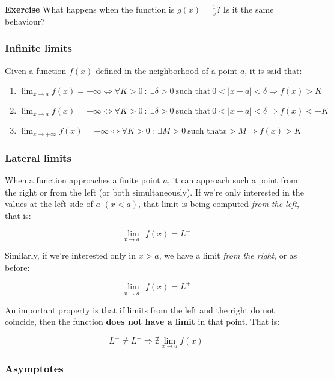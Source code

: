 \documentclass[11pt]{article}
\providecommand{\tightlist}{%
      \setlength{\itemsep}{0pt}\setlength{\parskip}{0pt}}
\begin{document}
    \textbf{Exercise} What happens when the function is
\(g(x) = \frac{1}{x}\)? Is it the same behaviour?

\hypertarget{infinite-limits}{%
\subsubsection{Infinite limits}\label{infinite-limits}}

Given a function \(f(x)\) defined in the neighborhood of a point \(a\),
it is said that:

\begin{enumerate}
\def\labelenumi{\arabic{enumi}.}
\tightlist
\item
  \(\lim_{x\rightarrow a} f(x) = +\infty \iff \forall K > 0 \ : \ \exists\delta > 0 \ \text{such that} \ 0<\lvert x-a\rvert<\delta\Rightarrow f(x) > K\)
\item
  \(\lim_{x\rightarrow a} f(x) = -\infty \iff \forall K > 0 \ : \ \exists\delta > 0 \ \text{such that} \ 0<\lvert x-a\rvert<\delta\Rightarrow f(x) < -K\)
\item
  \(\lim_{x\rightarrow +\infty} f(x) = +\infty \iff \forall K>0 \ : \ \exists M >0 \ \text{such that} x > M \Rightarrow f(x) > K\)
\end{enumerate}

\hypertarget{lateral-limits}{%
\subsubsection{Lateral limits}\label{lateral-limits}}

When a function approaches a finite point \(a\), it can approach such a
point from the right or from the left (or both simultaneously). If we're
only interested in the values at the left side of \(a\) \((x < a)\),
that limit is being computed \emph{from the left}, that is:

\[
\lim_{x\rightarrow a^{-}}f(x) = L^{-}
\]

Similarly, if we're interested only in \(x > a\), we have a limit
\emph{from the right}, or as before:

\[
\lim_{x\rightarrow a^{+}}f(x) = L^{+}
\]

An important property is that if limits from the left and the right do
not coincide, then the function \textbf{does not have a limit} in that
point. That is:

\[
L^+ \neq L^- \Rightarrow \nexists\lim_{x\rightarrow a} f(x)
\]

\hypertarget{asymptotes}{%
\subsubsection{Asymptotes}\label{asymptotes}}
\end{document}
